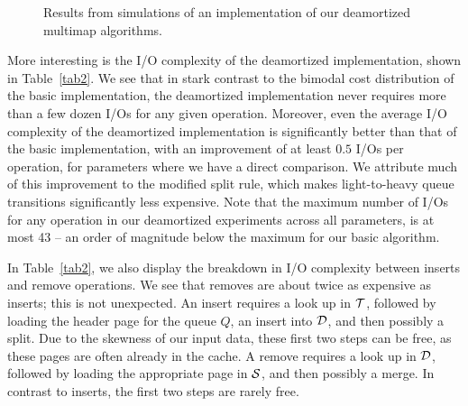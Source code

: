 \documentclass[11pt,letterpaper]{article}
\begin{document}
\setlength{\figwidth}{0.46\textwidth}
\begin{figure*}[!h]
\centering
\subfigure[Space usage for $\alpha=.99$.]
{
\texttt{[image: deamortized\_block\_usage\_hash2\_alpha=099.pdf]}
\label{fig-d-hash2a}
}
\subfigure[center][Space usage for $\alpha=1.1$.]
{
\texttt{[image: deamortized\_block\_usage\_hash2\_alpha=11.pdf]}
\label{fig-d-hash2b}
}
\vspace{-0.2cm}
\caption{Results from simulations of an implementation of our deamortized multimap algorithms.}
\end{figure*}


More interesting is the I/O complexity of the deamortized implementation,
shown in Table~\ref{tab2}. 
We see that in stark contrast to the bimodal cost distribution of the basic 
implementation, the deamortized implementation never requires more than a few 
dozen I/Os for any given operation. 
Moreover, even the average I/O complexity of the deamortized implementation is 
significantly better than that of the basic implementation, with an improvement
of at least $0.5$ I/Os per operation, for parameters where we have a direct comparison. 
We attribute much of this improvement to the modified split rule, 
which makes light-to-heavy queue transitions significantly less expensive.
Note that the maximum number of I/Os for any operation in our deamortized experiments
across all parameters, is at most 43 -- an order of magnitude below 
the maximum for our basic algorithm. 



In Table~\ref{tab2}, we also display the breakdown in I/O complexity between 
inserts and remove operations. We see that removes are about twice as expensive
as inserts; this is not unexpected.  An insert requires a look up in $\cal T$, 
followed by loading the header page for the queue $Q$, 
an insert into $\cal D$, and then possibly a split.  
Due to the skewness of our input data, these first two steps can be free, 
as these pages are often already in the cache. 
A remove requires a look up in $\cal D$, followed by
loading the appropriate page in $\cal S$, and then possibly a merge.  
In contrast to inserts, the first two steps are rarely free. 
\end{document}
